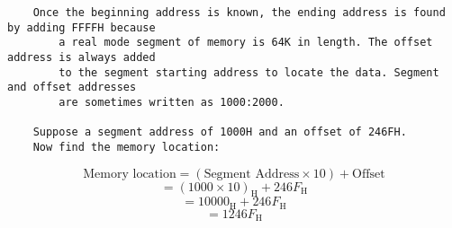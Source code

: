 \documentclass{article}
\begin{document}
\begin{verbatim}
    Once the beginning address is known, the ending address is found by adding FFFFH because
        a real mode segment of memory is 64K in length. The offset address is always added 
        to the segment starting address to locate the data. Segment and offset addresses 
        are sometimes written as 1000:2000.

    Suppose a segment address of 1000H and an offset of 246FH.
    Now find the memory location:    
\end{verbatim}

\[
\text{Memory location} = (\text{Segment Address} \times 10) + \text{Offset}
\]
\[
= (1000 \times 10)_{\text{H}} + 246F_{\text{H}}
\]
\[
= 10000_{\text{H}} + 246F_{\text{H}}
\]
\[
= 1246F_{\text{H}}
\]
\end{document}
